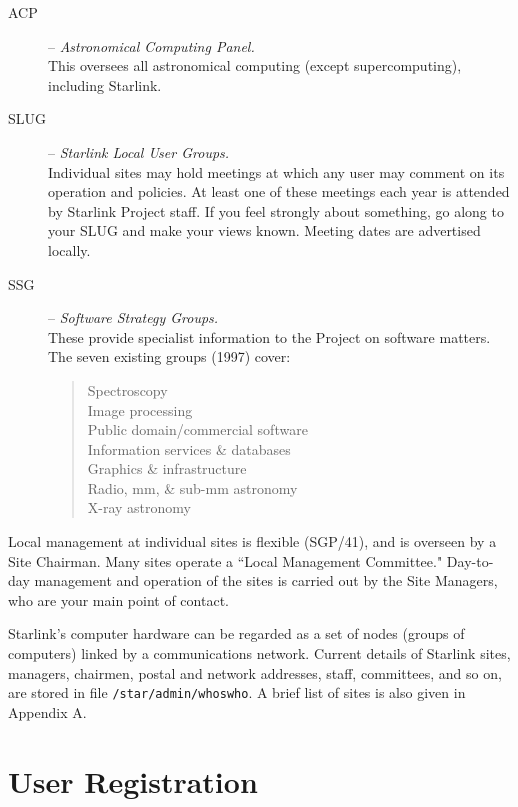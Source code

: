\documentclass[twoside]{article}
\newcommand{\htmlref}[2]{#1}
\newcommand{\xref}[3]{#1}
\begin{document}
\begin{description}
\item [ACP] -- {\em Astronomical Computing Panel.}\\
This oversees all astronomical computing (except supercomputing),
including Starlink.
\item [SLUG] -- {\em Starlink Local User Groups.}\\
Individual sites may hold meetings at which any user may comment on its
operation and policies.
At least one of these meetings each year is attended by Starlink Project staff.
If you feel strongly about something, go along to your SLUG and make your
views known.
Meeting dates are advertised locally.
\item [SSG] -- {\em Software Strategy Groups.}\\
These provide specialist information to the Project on software matters.
The seven existing groups (1997) cover:
\begin{quote}
\begin{description}
\item [Spectroscopy]
\item [Image processing]
\item [Public domain/commercial software]
\item [Information services \& databases]
\item [Graphics \& infrastructure]
\item [Radio, mm, \& sub-mm astronomy]
\item [X-ray astronomy]
\end{description}
\end{quote}
\end{description}

Local management at individual sites is flexible
(\xref{SGP/41}{sgp41}{}),
and is overseen by a Site Chairman.
Many sites operate a ``Local Management Committee."
Day-to-day management and operation of the sites is carried out by the
Site Managers, who are your main point of contact.

Starlink's computer hardware can be regarded as a set of nodes (groups of
computers) linked by a communications network.
Current details of Starlink sites, managers, chairmen, postal and network
addresses, staff, committees, and so on, are stored in file
{\tt /star/\-admin/\-whoswho}.
A brief list of sites is also given in
\htmlref{Appendix A}{AppendixA}.
\newpage

\section{User Registration}
\end{document}
